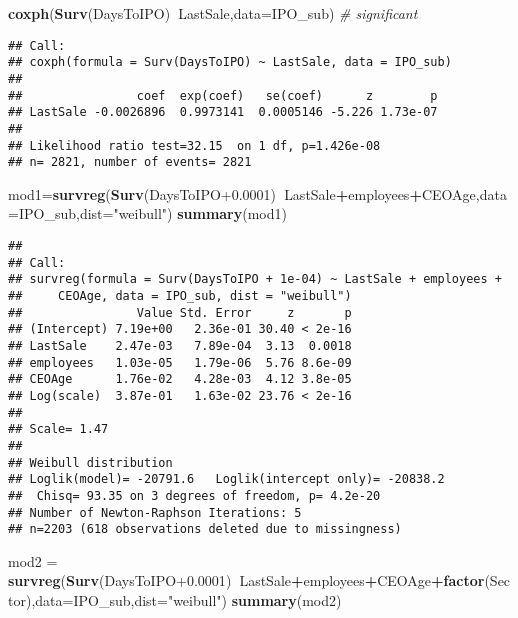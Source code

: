\documentclass[]{article}
\newenvironment{Shaded}{\begin{snugshade}}{\end{snugshade}}
\newcommand{\CommentTok}[1]{\textcolor[rgb]{0.56,0.35,0.01}{\textit{#1}}}
\newcommand{\DataTypeTok}[1]{\textcolor[rgb]{0.13,0.29,0.53}{#1}}
\newcommand{\FloatTok}[1]{\textcolor[rgb]{0.00,0.00,0.81}{#1}}
\newcommand{\KeywordTok}[1]{\textcolor[rgb]{0.13,0.29,0.53}{\textbf{#1}}}
\newcommand{\NormalTok}[1]{#1}
\newcommand{\OperatorTok}[1]{\textcolor[rgb]{0.81,0.36,0.00}{\textbf{#1}}}
\newcommand{\StringTok}[1]{\textcolor[rgb]{0.31,0.60,0.02}{#1}}
\begin{document}
\begin{Shaded}
\begin{Highlighting}[]
\KeywordTok{coxph}\NormalTok{(}\KeywordTok{Surv}\NormalTok{(DaysToIPO)}\OperatorTok{~}\NormalTok{LastSale,}\DataTypeTok{data=}\NormalTok{IPO_sub) }\CommentTok{# significant}
\end{Highlighting}
\end{Shaded}

\begin{verbatim}
## Call:
## coxph(formula = Surv(DaysToIPO) ~ LastSale, data = IPO_sub)
## 
##                coef  exp(coef)   se(coef)      z        p
## LastSale -0.0026896  0.9973141  0.0005146 -5.226 1.73e-07
## 
## Likelihood ratio test=32.15  on 1 df, p=1.426e-08
## n= 2821, number of events= 2821
\end{verbatim}

\begin{Shaded}
\begin{Highlighting}[]
\NormalTok{mod1=}\KeywordTok{survreg}\NormalTok{(}\KeywordTok{Surv}\NormalTok{(DaysToIPO}\FloatTok{+0.0001}\NormalTok{)}\OperatorTok{~}\NormalTok{LastSale}\OperatorTok{+}\NormalTok{employees}\OperatorTok{+}\NormalTok{CEOAge,}\DataTypeTok{data=}\NormalTok{IPO_sub,}\DataTypeTok{dist=}\StringTok{"weibull"}\NormalTok{)}
\KeywordTok{summary}\NormalTok{(mod1)}
\end{Highlighting}
\end{Shaded}

\begin{verbatim}
## 
## Call:
## survreg(formula = Surv(DaysToIPO + 1e-04) ~ LastSale + employees + 
##     CEOAge, data = IPO_sub, dist = "weibull")
##                Value Std. Error     z       p
## (Intercept) 7.19e+00   2.36e-01 30.40 < 2e-16
## LastSale    2.47e-03   7.89e-04  3.13  0.0018
## employees   1.03e-05   1.79e-06  5.76 8.6e-09
## CEOAge      1.76e-02   4.28e-03  4.12 3.8e-05
## Log(scale)  3.87e-01   1.63e-02 23.76 < 2e-16
## 
## Scale= 1.47 
## 
## Weibull distribution
## Loglik(model)= -20791.6   Loglik(intercept only)= -20838.2
##  Chisq= 93.35 on 3 degrees of freedom, p= 4.2e-20 
## Number of Newton-Raphson Iterations: 5 
## n=2203 (618 observations deleted due to missingness)
\end{verbatim}

\begin{Shaded}
\begin{Highlighting}[]
\NormalTok{mod2 =}\StringTok{ }\KeywordTok{survreg}\NormalTok{(}\KeywordTok{Surv}\NormalTok{(DaysToIPO}\FloatTok{+0.0001}\NormalTok{)}\OperatorTok{~}\NormalTok{LastSale}\OperatorTok{+}\NormalTok{employees}\OperatorTok{+}\NormalTok{CEOAge}\OperatorTok{+}\KeywordTok{factor}\NormalTok{(Sector),}\DataTypeTok{data=}\NormalTok{IPO_sub,}\DataTypeTok{dist=}\StringTok{"weibull"}\NormalTok{)}
\KeywordTok{summary}\NormalTok{(mod2)}
\end{Highlighting}
\end{Shaded}
\end{document}
